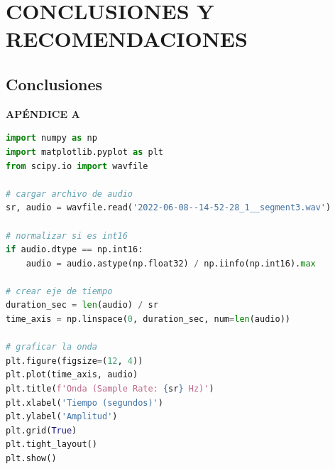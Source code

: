 \documentclass[12pt]{report}
\begin{document}
\pagebreak
\chapter{CONCLUSIONES Y RECOMENDACIONES}


\section{Conclusiones}





\pagebreak
{}
\printbibliography
\thispagestyle{empty}


\pagebreak
{}
\begin{center}
\large\textbf{APÉNDICE A}
\end{center}

\begin{lstlisting}[language=Python, caption={Visualización de la forma de onda de un archivo de audio.}, label={lst:waveform}]
import numpy as np
import matplotlib.pyplot as plt
from scipy.io import wavfile

# cargar archivo de audio
sr, audio = wavfile.read('2022-06-08--14-52-28_1__segment3.wav')

# normalizar si es int16
if audio.dtype == np.int16:
    audio = audio.astype(np.float32) / np.iinfo(np.int16).max

# crear eje de tiempo
duration_sec = len(audio) / sr
time_axis = np.linspace(0, duration_sec, num=len(audio))

# graficar la onda
plt.figure(figsize=(12, 4))
plt.plot(time_axis, audio)
plt.title(f'Onda (Sample Rate: {sr} Hz)')
plt.xlabel('Tiempo (segundos)')
plt.ylabel('Amplitud')
plt.grid(True)
plt.tight_layout()
plt.show()
\end{lstlisting}
\end{document}
